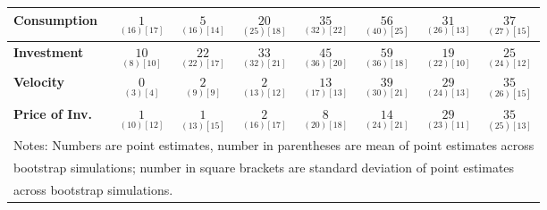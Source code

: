 \documentclass{article}
\begin{document}
\begin{tabular}{|l|c|@{}c|c|@{}c|c|@{}c|c|}
 \textbf{Consumption} & $\underset{( 16) [ 17]}{  1}$ & $\underset{( 16) [ 14]}{  5}$ & $\underset{( 25) [ 18]}{ 20}$ & $\underset{( 32) [ 22]}{ 35}$ & $\underset{( 40) [ 25]}{ 56}$ & $\underset{( 26) [ 13]}{ 31}$ & $\underset{( 27) [ 15]}{ 37}$ \\ \hline 
 \textbf{Investment} & $\underset{(  8) [ 10]}{ 10}$ & $\underset{( 22) [ 17]}{ 22}$ & $\underset{( 32) [ 21]}{ 33}$ & $\underset{( 36) [ 20]}{ 45}$ & $\underset{( 36) [ 18]}{ 59}$ & $\underset{( 22) [ 10]}{ 19}$ & $\underset{( 24) [ 12]}{ 25}$ \\ \hline 
 \textbf{Velocity} & $\underset{(  3) [  4]}{  0}$ & $\underset{(  9) [  9]}{  2}$ & $\underset{( 13) [ 12]}{  2}$ & $\underset{( 17) [ 13]}{ 13}$ & $\underset{( 30) [ 21]}{ 39}$ & $\underset{( 24) [ 13]}{ 29}$ & $\underset{( 26) [ 15]}{ 35}$ \\ \hline 
 \textbf{Price of Inv.} & $\underset{( 10) [ 12]}{  1}$ & $\underset{( 13) [ 15]}{  1}$ & $\underset{( 16) [ 17]}{  2}$ & $\underset{( 20) [ 18]}{  8}$ & $\underset{( 24) [ 21]}{ 14}$ & $\underset{( 23) [ 11]}{ 29}$ & $\underset{( 25) [ 13]}{ 35}$ \\ \hline 
 \multicolumn{8}{|l|}{Notes: Numbers are point estimates, number in 
 parentheses are mean of point estimates across} \\ \hline 
 \multicolumn{8}{|l|}{bootstrap simulations; number in square brackets are 
 standard deviation of point estimates} \\ \hline 
 \multicolumn{8}{|l|}{across bootstrap simulations.} \\ \hline 
 \end{tabular} 
\end{document}
